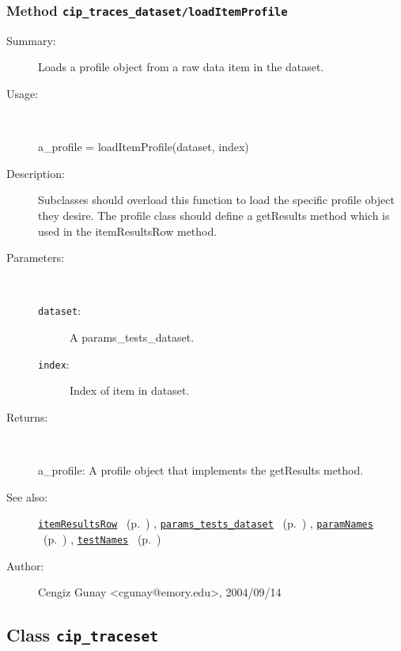\subsubsection[Method \texttt{loadItemProfile}]{Method \texttt{cip\_traces\_dataset/loadItemProfile}}%
%
\label{ref_cip_traces_dataset__loadItemProfile}%
\hypertarget{ref_cip_traces_dataset__loadItemProfile}{}%
\begin{description}
\item[Summary:]Loads a profile object from a raw data item in the dataset.
%
\item[Usage:]~%
\begin{lyxcode}%
a\_profile = loadItemProfile(dataset, index)
%
\end{lyxcode}%
%
\item[Description:]%
Subclasses should overload this function to load the specific profile
 object they desire. The profile class should define a getResults method
 which is used in the itemResultsRow method.
\item[Parameters:]~
\begin{description}%
\item[\texttt{dataset}:]
 A params\_tests\_dataset.
\item[\texttt{index}:]
 Index of item in dataset.
\end{description}%
%
\item[Returns:]~

	a\_profile: A profile object that implements the getResults method.
%
%
\item[See also:]%
\hyperlink{ref_itemResultsRow}{\texttt{itemResultsRow}}%
\ (p.~\pageref{ref_itemResultsRow})%
%
, \hyperlink{ref_params_tests_dataset}{\texttt{params\_tests\_dataset}}%
\ (p.~\pageref{ref_params_tests_dataset})%
%
, \hyperlink{ref_paramNames}{\texttt{paramNames}}%
\ (p.~\pageref{ref_paramNames})%
%
, \hyperlink{ref_testNames}{\texttt{testNames}}%
\ (p.~\pageref{ref_testNames})%
%
%
\item[Author:]%
Cengiz Gunay <cgunay@emory.edu>, 2004/09/14%
\end{description}
\methodline%
\subsection{Class \texttt{cip\_traceset}}%
%
\label{ref_cip_traceset}%
\hypertarget{ref_cip_traceset}{}%
